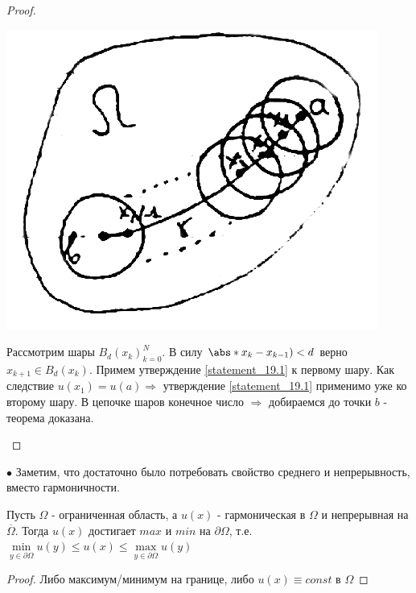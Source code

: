 \begin{theorem}
\begin{proof}
\begin{itemize}
\begin{center}
 \includegraphics[scale=0.5]{19_3_new}
\end{center}
 Рассмотрим шары ${B_d(x_k)}_{k=0}^N$. В силу
 $\abs*{x_k - x_{k-1}}) < d$ верно $x_{k+1} \in B_d(x_k)$. 
  Примем утверждение \ref{statement_19.1} к первому шару. 
  Как следствие $u(x_1) = u(a)\Rightarrow$ утверждение \ref{statement_19.1} применимо уже ко второму шару.
   В цепочке шаров конечное число 
  $\Rightarrow$ добираемся до точки $b$ - теорема доказана.  
\end{itemize}
\end{proof}
\end{theorem}

$\bullet$ Заметим, что достаточно было потребовать
свойство среднего и непрерывность, вместо гармоничности.


\begin{conseq}
\label{conseq19.1}
Пусть $\Omega$ - ограниченная область, а $u(x)$ - гармоническая в $\Omega$ и непрерывная на $\overline{\Omega}$.
Тогда $u(x)$ достигает $max$ и $min$ на $\partial \Omega$, т.е.
$\min\limits_{y \in \partial \Omega}u(y) \leq u(x) \leq \max\limits_{y \in \partial \Omega}u(y)$
	\begin{proof}
	Либо максимум/минимум на границе, либо $u(x)\equiv const$ в $\Omega$
	\end{proof}
\end{conseq}


